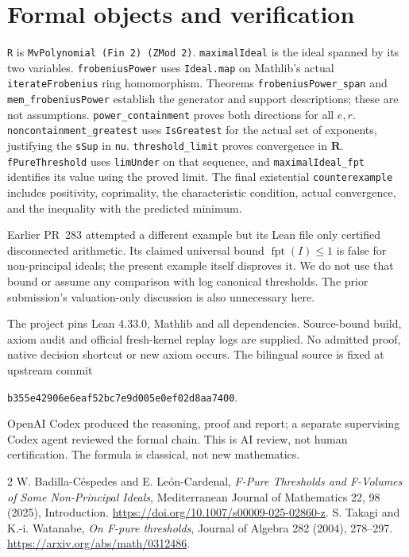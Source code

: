 \documentclass[11pt]{article}
\begin{document}
\section{Formal objects and verification}
\texttt{R} is \texttt{MvPolynomial (Fin 2) (ZMod 2)}.
\texttt{maximalIdeal} is the ideal spanned by its two variables.
\texttt{frobeniusPower} uses \texttt{Ideal.map} on Mathlib's actual
\texttt{iterateFrobenius} ring homomorphism. Theorems
\texttt{frobeniusPower\_span} and \texttt{mem\_frobeniusPower} establish
the generator and support descriptions; these are not assumptions.
\texttt{power\_containment} proves both directions for all $e,r$.
\texttt{noncontainment\_greatest} uses \texttt{IsGreatest} for the actual
set of exponents, justifying the \texttt{sSup} in \texttt{nu}.
\texttt{threshold\_limit} proves convergence in $\mathbf R$.
\texttt{fPureThreshold} uses \texttt{limUnder} on that sequence, and
\texttt{maximalIdeal\_fpt} identifies its value using the proved limit.
The final existential \texttt{counterexample} includes positivity,
coprimality, the characteristic condition, actual convergence, and the
inequality with the predicted minimum.

Earlier PR~283 attempted a different example but its Lean file only
certified disconnected arithmetic. Its claimed universal bound
$\operatorname{fpt}(I)\leq1$ is false for non-principal ideals; the present
example itself disproves it. We do not use that bound or assume any
comparison with log canonical thresholds. The prior submission's
valuation-only discussion is also unnecessary here.

The project pins Lean 4.33.0, Mathlib and all dependencies. Source-bound
build, axiom audit and official fresh-kernel replay logs are supplied.
No admitted proof, native decision shortcut or new axiom occurs.
The bilingual source is fixed at upstream commit\par\noindent
\texttt{b355e42906e6eaf52bc7e9d005e0ef02d8aa7400}.\par
OpenAI Codex produced the reasoning, proof and report; a separate
supervising Codex agent reviewed the formal chain. This is AI review,
not human certification. The formula is classical, not new mathematics.

\begin{thebibliography}{2}
 W. Badilla-C\'espedes and E. Le\'on-Cardenal,
\emph{F-Pure Thresholds and F-Volumes of Some Non-Principal Ideals},
Mediterranean Journal of Mathematics 22, 98 (2025), Introduction.
\url{https://doi.org/10.1007/s00009-025-02860-z}.
 S. Takagi and K.-i. Watanabe, \emph{On F-pure thresholds},
Journal of Algebra 282 (2004), 278--297.
\url{https://arxiv.org/abs/math/0312486}.
\end{thebibliography}
\end{document}
